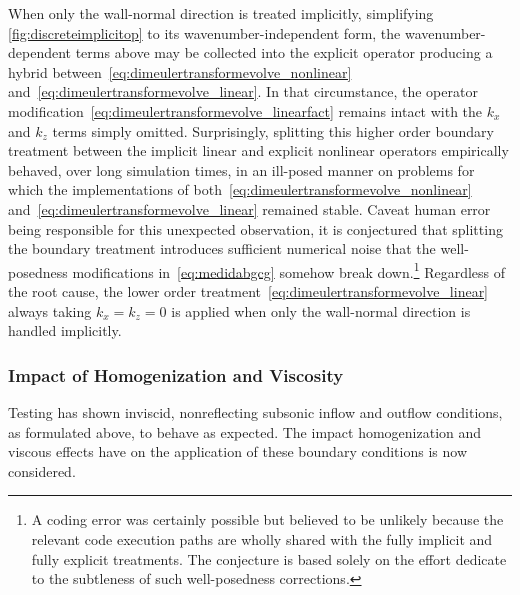 When only the wall-normal direction is treated implicitly,
simplifying \autoref{fig:discreteimplicitop} to its
wavenumber-independent form, the wavenumber-dependent terms
above may be collected into the explicit operator producing
a hybrid between~\eqref{eq:dimeulertransformevolve_nonlinear}
and~\eqref{eq:dimeulertransformevolve_linear}.  In that circumstance,
the operator modification~\eqref{eq:dimeulertransformevolve_linearfact}
remains intact with the $k_x$ and $k_z$ terms simply omitted.
Surprisingly, splitting this higher order boundary treatment between the
implicit linear and explicit nonlinear operators empirically behaved, over long
simulation times, in an ill-posed manner on problems for which the
implementations of both~\eqref{eq:dimeulertransformevolve_nonlinear}
and~\eqref{eq:dimeulertransformevolve_linear} remained stable.
%
Caveat human error being responsible for this unexpected observation,
it is conjectured that splitting the boundary treatment introduces
sufficient numerical noise that the well-posedness modifications
in~\eqref{eq:medidabgcg} somehow break down.\footnote{A coding error
was certainly possible but believed to be unlikely because the relevant
code execution paths are wholly shared with the fully implicit
and fully explicit treatments.  The conjecture is based solely on the
effort \citet{Rowley2000Discretely} dedicate to the subtleness
of such well-posedness corrections.}  Regardless of the root cause,
the lower order treatment~\eqref{eq:dimeulertransformevolve_linear}
always taking $k_x = k_z = 0$ is applied when only the wall-normal
direction is handled implicitly.

\subsubsection{Impact of Homogenization and Viscosity}
\label{sec:impacthomovisc}

Testing has shown inviscid, nonreflecting subsonic inflow and outflow
conditions, as formulated above, to behave as expected.  The impact
homogenization and viscous effects have on the application of these boundary
conditions is now considered.

